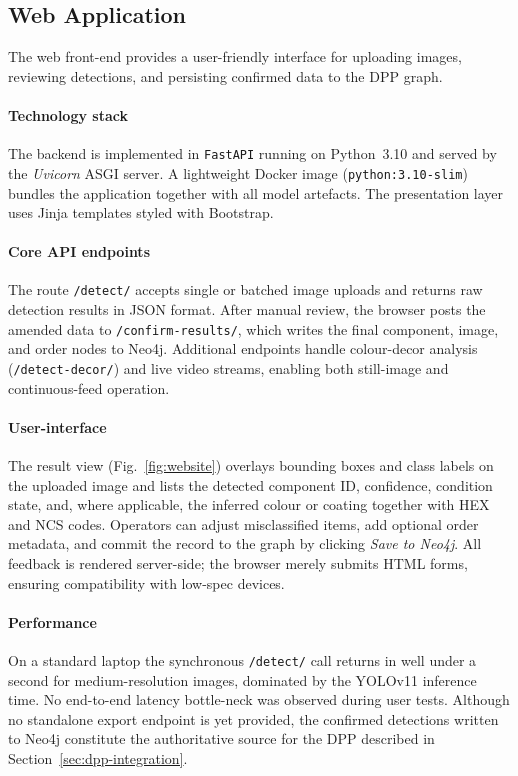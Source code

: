 \documentclass[3p,times,procedia]{elsarticle}
\begin{document}
\subsection{Web Application}
\label{sec:results-webapp}

The web front-end provides a user-friendly interface for uploading images, reviewing detections, and persisting confirmed data to the DPP graph.

\paragraph{Technology stack}
The backend is implemented in \texttt{FastAPI} running on Python~3.10 and served by the \emph{Uvicorn} ASGI server.  
A lightweight Docker image (\texttt{python:3.10-slim}) bundles the application together with all model artefacts.  
The presentation layer uses Jinja templates styled with Bootstrap.

\paragraph{Core API endpoints}
The route \texttt{/detect/} accepts single or batched image uploads and returns raw detection results in JSON format.  
After manual review, the browser posts the amended data to \texttt{/confirm-results/}, which writes the final component, image, and order nodes to Neo4j.  
Additional endpoints handle colour-decor analysis (\texttt{/detect-decor/}) and live video streams, enabling both still-image and continuous-feed operation.

\paragraph{User-interface}
The result view (Fig.~\ref{fig:website}) overlays bounding boxes and class labels on the uploaded image and lists the detected component ID, confidence, condition state, and, where applicable, the inferred colour or coating together with HEX and NCS codes.  
Operators can adjust misclassified items, add optional order metadata, and commit the record to the graph by clicking \emph{Save to Neo4j}.  
All feedback is rendered server-side; the browser merely submits HTML forms, ensuring compatibility with low-spec devices.

\paragraph{Performance}
On a standard laptop the synchronous \texttt{/detect/} call returns in well under a second for medium-resolution images, dominated by the YOLOv11 inference time.  No end-to-end latency bottle-neck was observed during user tests. Although no standalone export endpoint is yet provided, the confirmed detections written to Neo4j constitute the authoritative source for the DPP described in Section~\ref{sec:dpp-integration}.
\end{document}
